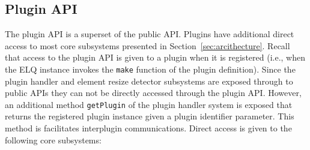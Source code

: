 \documentclass[a4paper,11pt]{kth-mag}
\newcommand{\code}[1]{\texttt{#1}}
\begin{document}
      \subsection{Plugin API}\label{sec:plugin-api}
        The plugin \gls{API} is a superset of the public \gls{API}.
        Plugins have additional direct access to most core subsystems presented in Section~\ref{sec:arcithecture}.
        Recall that access to the plugin \gls{API} is given to a plugin when it is registered (i.e., when the \gls{ELQ} instance invokes the \code{make} function of the plugin definition).
        Since the plugin handler and element resize detector subsystems are exposed through to public \glspl{API} they can not be directly accessed through the plugin \gls{API}.
        However, an additional method \code{getPlugin} of the plugin handler system is exposed that returns the registered plugin instance given a plugin identifier parameter.
        This method is facilitates interplugin communications.
        Direct access is given to the following core subsystems:
\end{document}
